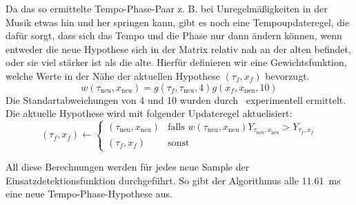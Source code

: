 {{{			%
			Da das so ermittelte Tempo-Phase-Paar  z. B. bei Unregelmäßigkeiten in der Musik etwas hin und her springen kann,
				gibt es noch eine Tempoupdateregel,
				die dafür sorgt,
				dass sich das Tempo und die Phase nur dann ändern können,
				wenn entweder die neue Hypothese sich in der Matrix relativ nah an der alten befindet,
				oder sie viel stärker ist als die alte.
			Hierfür definieren wir eine Gewichtsfunktion,
				welche Werte in der Nähe der aktuellen Hypothese $(\tau_f, x_f)$ bevorzugt.
			\begin{equation}
				w(\tau_{\text{neu}}, x_{\text{neu}}) =
					g(\tau_f, \tau_{\text{neu}}, 4)
					g(x_f, x_{\text{neu}}, 10)
			\end{equation}
			Die Standartabweichungen von \num{4} und \num{10} wurden durch~\cite{2011_PlRoSt} experimentell ermittelt.
			Die aktuelle Hypothese wird mit folgender Updateregel aktuelisiert:
			\begin{equation}
				(\tau_f, x_f) \leftarrow
				\begin{cases}
					(\tau_{\text{neu}}, x_{\text{neu}}) &
						\text{falls } w(\tau_{\text{neu}}, x_{\text{neu}}) Y_{\tau_{\text{neu}}, x_{\text{neu}}} > Y_{\tau_f, x_f} \\
					(\tau_f, x_f) &
						\text{sonst}
				\end{cases}
			\end{equation}

			All diese Berechnungen werden für jedes neue Sample der Einsatzdetektionsfunktion durchgeführt.
			So gibt der Algorithmus alle \SI{11.61}{\milli\second} eine neue Tempo-Phase-Hypothese aus.
		}
	}
}
